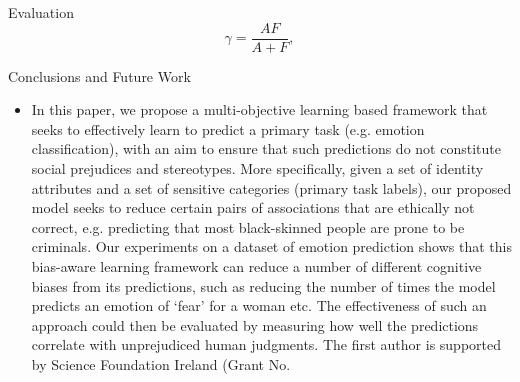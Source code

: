 \documentclass{beamer}
\begin{document}
%
\begin{frame}{Evaluation}
%
\begin{equation}
\gamma = \frac{AF}{A+F},    
\end{equation}
\end{frame}
%
\begin{frame}{Conclusions and Future Work}
%
\begin{itemize}
\item
In this paper, we propose a multi-objective learning based framework that seeks to effectively learn to predict a primary task (e.g. emotion classification), with an aim to ensure that such predictions do not constitute social prejudices and stereotypes. More specifically, given a set of identity attributes and a set of sensitive categories (primary task labels), our proposed model seeks to reduce certain pairs of associations that are ethically not correct, e.g. predicting that most black-skinned people are prone to be criminals. Our experiments on a dataset of emotion prediction shows that this bias-aware learning framework can reduce a number of different cognitive biases from its predictions, such as reducing the number of times the model predicts an emotion of `fear' for a woman etc. The effectiveness of such an approach could then be evaluated by measuring how well the predictions correlate with unprejudiced human judgments. The first author is supported by Science Foundation Ireland (Grant No.
\end{itemize}
\end{frame}
%
\end{document}
